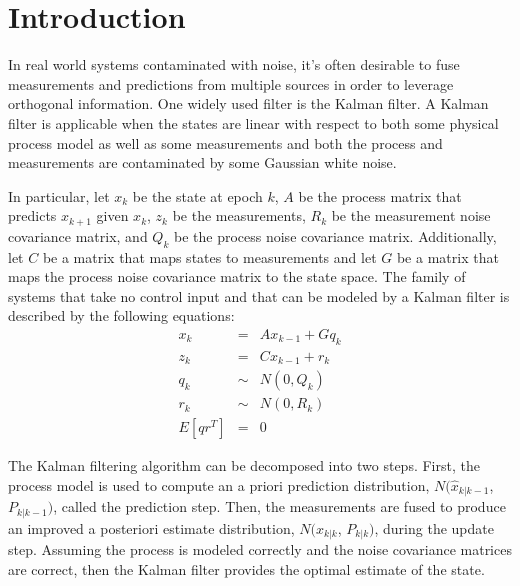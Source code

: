 \section{Introduction}\label{sec:intro}
In real world systems contaminated with noise, it's often desirable to fuse measurements and predictions from multiple sources in order to leverage orthogonal information.  One widely used filter is the Kalman filter.  A Kalman filter is applicable when the states are linear with respect to both some physical process model as well as some measurements and both the process and measurements are contaminated by some Gaussian white noise.

In particular, let $x_k$ be the state at epoch $k$, $A$ be the process matrix that predicts $x_{k+1}$ given $x_k$, $z_k$ be the measurements, $R_k$ be the measurement noise covariance matrix, and $Q_k$ be the process noise covariance matrix.  Additionally, let $C$ be a matrix that maps states to measurements and let $G$ be a matrix that maps the process noise covariance matrix to the state space.  The family of systems that take no control input and that can be modeled by a Kalman filter is described by the following equations:\\
\begin{equation}
\begin{aligned}
x_{k} &=& A x_{k-1} + G q_{k}\\
z_{k} &=& C x_{k-1} + r_{k}\\
q_{k} &\sim& N(0, Q_k)\\
r_{k} &\sim& N(0, R_k)\\
E[qr^T] &=& 0
\end{aligned}
\end{equation}

The Kalman filtering algorithm can be decomposed into two steps.  First, the process model is used to compute an a priori prediction distribution, $N(\hat{x}_{k|k-1}$, $P_{k|k-1})$, called the prediction step.  Then, the measurements are fused to produce an improved a posteriori estimate distribution, $N(\hat{x}_{k|k}$, $P_{k|k})$, during the update step.  Assuming the process is modeled correctly and the noise covariance matrices are correct, then the Kalman filter provides the optimal estimate of the state.

